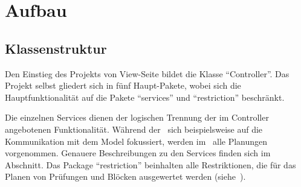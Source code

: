 \section{Aufbau}\label{sec:aufbau}

\subsection{Klassenstruktur}\label{subsec:klassenstruktur}
\begin{center}
\end{center}

\clearpage
Den Einstieg des Projekts von View-Seite bildet die Klasse \enquote{Controller}.
Das Projekt selbst gliedert sich in fünf Haupt-Pakete, wobei sich die Hauptfunktionalität
auf die Pakete \enquote{services} und \enquote{restriction} beschränkt.

Die einzelnen Services dienen der logischen Trennung der im Controller angebotenen Funktionalität.
Während der~ sich beispielsweise auf die Kommunikation mit dem Model fokussiert,
werden im~ alle Planungen vorgenommen.
Genauere Beschreibungen zu den Services finden sich im Abschnitt.
Das Package \enquote{restriction} beinhalten alle Restriktionen, die für das Planen von Prüfungen
und Blöcken ausgewertet werden (siehe~).

